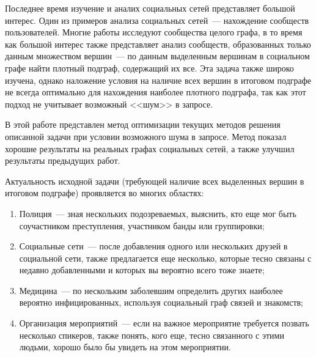 \startprefacepage


Последнее время изучение и аналих социальных сетей представляет большой интерес. 
Один из примеров анализа социальных сетей~--- нахождение сообществ пользователей. 
Многие работы исследуют сообщества целого графа, в то время как большой интерес также представляет анализ сообществ, 
образованных только данным множеством вершин~--- по данным выделенным вершинам в социальном графе найти плотный подграф, содержащий их все. 
Эта задача также широко изучена, однако наложение условия на наличие всех вершин в итоговом подграфе не всегда оптимально для нахождения наиболее плотного подграфа, так как этот подход не учитывает возможный <<шум>> в запросе.

В этой работе представлен метод оптимизации текущих методов решения описанной задачи при условии возможного шума в запросе. Метод показал хорошие результаты на реальных графах социальных сетей, а также улучшил результаты предыдущих работ.


Актуальность исходной задачи (требующей наличие всех выделенных вершин в итоговом подграфе) проявляется во многих областях:
\begin{enumerate}
  \item Полиция~--- зная нескольких подозреваемых, выяснить, кто еще мог быть соучастником преступления, участником банды или группировки;
  \item Социальные сети~--- после добавления одного или нескольких друзей в социальной сети, также предлагается еще несколько, которые тесно связаны с недавно добавленными и которых вы вероятно всего тоже знаете;
  \item Медицина~--- по нескольким заболевшим определить других наиболее вероятно инфицированных, используя социальный граф связей и знакомств;
  \item Организация мероприятий~--- если на важное мероприятие требуется позвать несколько спикеров, также понять, кого еще, тесно связанного с этими людьми, хорошо было бы увидеть на этом мероприятии.
\end{enumerate}


